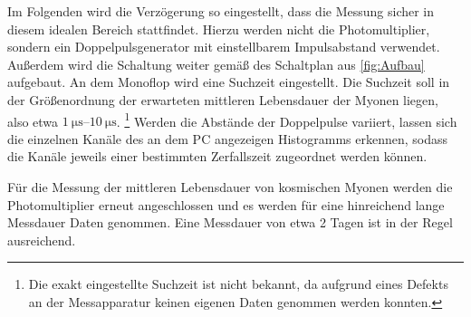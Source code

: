  Im Folgenden wird die Verzögerung so eingestellt, dass die Messung sicher in diesem idealen Bereich stattfindet. Hierzu werden nicht die Photomultiplier, sondern
  ein Doppelpulsgenerator mit einstellbarem Impulsabstand verwendet. Außerdem wird die Schaltung weiter gemäß des Schaltplan aus \autoref{fig:Aufbau} aufgebaut. 
  An dem Monoflop wird eine Suchzeit eingestellt. Die Suchzeit soll in der Größenordnung der erwarteten mittleren Lebensdauer der Myonen liegen, also etwa $\qtyrange{1}{10}{\micro\second}$.
  \footnote{Die exakt eingestellte Suchzeit ist nicht bekannt, da aufgrund eines Defekts an der Messapparatur keinen eigenen Daten genommen werden konnten.}
  Werden die Abstände der Doppelpulse variiert, lassen sich die einzelnen Kanäle des an dem PC angezeigen Histogramms erkennen, sodass die Kanäle jeweils einer bestimmten Zerfallszeit
  zugeordnet werden können.

  Für die Messung der mittleren Lebensdauer von kosmischen Myonen werden die Photomultiplier erneut angeschlossen und es werden für eine hinreichend lange Messdauer Daten genommen. Eine
  Messdauer von etwa 2 Tagen ist in der Regel ausreichend.
